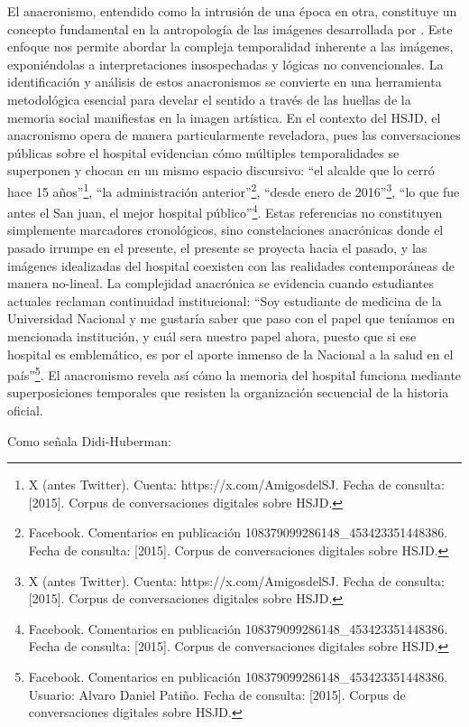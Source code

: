 El anacronismo, entendido como la intrusión de una época en otra, constituye un concepto fundamental en la antropología de las imágenes desarrollada por \parencite{DidiHuberman2011}. Este enfoque nos permite abordar la compleja temporalidad inherente a las imágenes, exponiéndolas a interpretaciones insospechadas y lógicas no convencionales. La identificación y análisis de estos anacronismos se convierte en una herramienta metodológica esencial para develar el sentido a través de las huellas de la memoria social manifiestas en la imagen artística. En el contexto del HSJD, el anacronismo opera de manera particularmente reveladora, pues las conversaciones públicas sobre el hospital evidencian cómo múltiples temporalidades se superponen y chocan en un mismo espacio discursivo: ``el alcalde que lo cerró hace 15 años''\footnote{X (antes Twitter). Cuenta: https://x.com/AmigosdelSJ. Fecha de consulta: [2015]. Corpus de conversaciones digitales sobre HSJD.}, ``la administración anterior''\footnote{Facebook. Comentarios en publicación 108379099286148\_453423351448386. Fecha de consulta: [2015]. Corpus de conversaciones digitales sobre HSJD.}, ``desde enero de 2016''\footnote{X (antes Twitter). Cuenta: https://x.com/AmigosdelSJ. Fecha de consulta: [2015]. Corpus de conversaciones digitales sobre HSJD.}, ``lo que fue antes el San juan, el mejor hospital público''\footnote{Facebook. Comentarios en publicación 108379099286148\_453423351448386. Fecha de consulta: [2015]. Corpus de conversaciones digitales sobre HSJD.}. Estas referencias no constituyen simplemente marcadores cronológicos, sino constelaciones anacrónicas donde el pasado irrumpe en el presente, el presente se proyecta hacia el pasado, y las imágenes idealizadas del hospital coexisten con las realidades contemporáneas de manera no-lineal. La complejidad anacrónica se evidencia cuando estudiantes actuales reclaman continuidad institucional: ``Soy estudiante de medicina de la Universidad Nacional y me gustaría saber que paso con el papel que teníamos en mencionada institución, y cuál sera nuestro papel ahora, puesto que si ese hospital es emblemático, es por el aporte inmenso de la Nacional a la salud en el país''\footnote{Facebook. Comentarios en publicación 108379099286148\_453423351448386. Usuario: Alvaro Daniel Patiño. Fecha de consulta: [2015]. Corpus de conversaciones digitales sobre HSJD.}. El anacronismo revela así cómo la memoria del hospital funciona mediante superposiciones temporales que resisten la organización secuencial de la historia oficial.

Como señala Didi-Huberman: 

